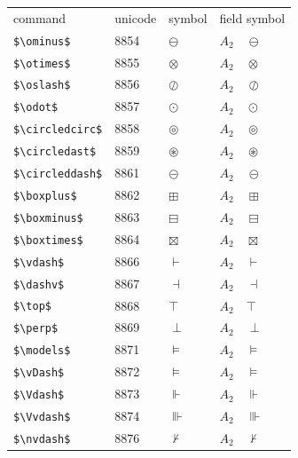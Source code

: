 ﻿\documentclass{article}
\begin{document}
\begin{table}
\begin{center}
\begin{tabular}{llll}
 command                    & unicode & symbol              & field symbol\\
 \verb#$\ominus$#           & 8854    & $\ominus$           & $A_2\quad \ominus$\\
 \verb#$\otimes$#           & 8855    & $\otimes$           & $A_2\quad \otimes$\\
 \verb#$\oslash$#           & 8856    & $\oslash$           & $A_2\quad \oslash$\\
 \verb#$\odot$#             & 8857    & $\odot$             & $A_2\quad \odot$\\
 \verb#$\circledcirc$#      & 8858    & $\circledcirc$      & $A_2\quad \circledcirc$\\
 \verb#$\circledast$#       & 8859    & $\circledast$       & $A_2\quad \circledast$\\
 \verb#$\circleddash$#      & 8861    & $\circleddash$      & $A_2\quad \circleddash$\\
 \verb#$\boxplus$#          & 8862    & $\boxplus$          & $A_2\quad \boxplus$\\
 \verb#$\boxminus$#         & 8863    & $\boxminus$         & $A_2\quad \boxminus$\\
 \verb#$\boxtimes$#         & 8864    & $\boxtimes$         & $A_2\quad \boxtimes$\\
 \verb#$\vdash$#            & 8866    & $\vdash$            & $A_2\quad \vdash$\\
 \verb#$\dashv$#            & 8867    & $\dashv$            & $A_2\quad \dashv$\\
 \verb#$\top$#              & 8868    & $\top$              & $A_2\quad \top$\\
 \verb#$\perp$#             & 8869    & $\perp$             & $A_2\quad \perp$\\
 \verb#$\models$#           & 8871    & $\models$           & $A_2\quad \models$\\
 \verb#$\vDash$#            & 8872    & $\vDash$            & $A_2\quad \vDash$\\
 \verb#$\Vdash$#            & 8873    & $\Vdash$            & $A_2\quad \Vdash$\\
 \verb#$\Vvdash$#           & 8874    & $\Vvdash$           & $A_2\quad \Vvdash$\\
 \verb#$\nvdash$#           & 8876    & $\nvdash$           & $A_2\quad \nvdash$\\

\end{tabular}
\end{center}
\end{table}
\end{document}
